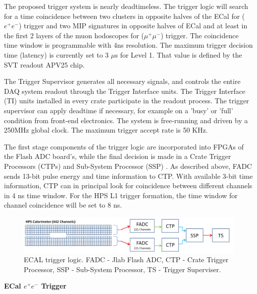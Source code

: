 


The proposed trigger system is nearly deadtimeless. 
The trigger logic will search for a time coincidence between two clusters in opposite halves of the ECal for ($e^+e^-$) trigger and two MIP signatures in opposite halves of ECal and at least in the first 2 layers of the muon hodoscopes for ($\mu^+\mu^-$) trigger. The coincidence time window is programmable with 4ns resolution. The maximum trigger decision time (latency) is currently set to 3 $\mu$s for Level 1. That value is defined by the SVT readout APV25 chip.

The Trigger Supervisor generates all necessary signals, and controls the entire DAQ system readout through the Trigger Interface units. The Trigger Interface (TI) units installed in every crate participate in the readout process. The trigger supervisor can apply deadtime if necessary, for example on a 'busy' or 'full' condition from front-end electronics. The system is free-running and driven by a 250MHz global clock. The maximum trigger accept rate is 50 KHz.

The first stage components of the trigger logic are incorporated into FPGAs of the Flash ADC board's, while the final decision is made in a Crate Trigger Processors (CTPs) and  Sub-System Processor (SSP) . As described above, 
FADC sends 13-bit pulse energy and time information to CTP. With available 3-bit time information, CTP can in principal look for coincidence between different channels in 4 ns time window. For the HPS L1 trigger formation, the time window for channel coincidence will be set to 8 ns.

\begin{figure}[t]
\includegraphics[scale=0.25]{daq_trigger/figures/hps_trigger_cal}
\caption{\small{ECAL trigger logic. FADC - Jlab Flash ADC, CTP - Crate Trigger Processor, SSP - Sub-System Processor, TS - Trigger Superviser.}}
\label{fig:hps_trigger_cal}
\end{figure}

{\bf ECal $e^+e^-$ Trigger} 

